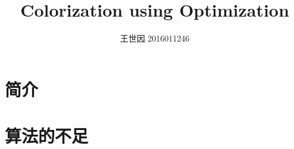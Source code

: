 \documentclass{article}
\title{Colorization using Optimization}
\author{王世因 2016011246}
\date{}
\begin{document}
\maketitle

\section{简介}


\section{}


\section{算法的不足}
\end{document}
